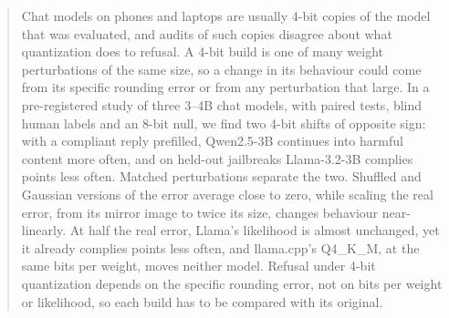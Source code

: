 \begin{abstract}
Chat models on phones and laptops are usually 4-bit copies of the model that was evaluated, and audits of such copies disagree about what quantization does to refusal. A 4-bit build is one of many weight perturbations of the same size, so a change in its behaviour could come from its specific rounding error or from any perturbation that large. In a pre-registered study of three 3--4B chat models, with paired tests, blind human labels and an 8-bit null, we find two 4-bit shifts of opposite sign: with a compliant reply prefilled, Qwen2.5-3B continues into harmful content more often, and on held-out jailbreaks Llama-3.2-3B complies  points less often. Matched perturbations separate the two. Shuffled and Gaussian versions of the error average close to zero, while scaling the real error, from its mirror image to twice its size, changes behaviour near-linearly. At half the real error, Llama's likelihood is almost unchanged, yet it already complies  points less often, and llama.cpp's Q4\_K\_M, at the same bits per weight, moves neither model. Refusal under 4-bit quantization depends on the specific rounding error, not on bits per weight or likelihood, so each build has to be compared with its original.
\end{abstract}
